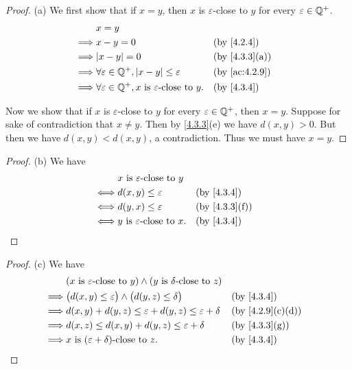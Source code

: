 \begin{proof}{(a)}
  We first show that if \(x = y\), then \(x\) is \(\varepsilon\)-close to \(y\) for every \(\varepsilon \in \mathbb{Q}^+\).
  \begin{align*}
             & x = y                                                                                                    \\
    \implies & x - y = 0                                                               &  & \by{4.2.4}                  \\
    \implies & \abs{x - y} = 0                                                         &  & \text{(by \cref{4.3.3}(a))} \\
    \implies & \forall \varepsilon \in \Q^+, \abs{x - y} \leq \varepsilon              &  & \by{ac:4.2.9}               \\
    \implies & \forall \varepsilon \in \Q^+, x \text{ is \(\varepsilon\)-close to } y. &  & \by{4.3.4}
  \end{align*}

  Now we show that if \(x\) is \(\varepsilon\)-close to \(y\) for every \(\varepsilon \in \mathbb{Q}^+\), then \(x = y\).
  Suppose for sake of contradiction that \(x \neq y\).
  Then by \cref{4.3.3}(e) we have \(d(x, y) > 0\).
  But then we have \(d(x, y) < d(x, y)\), a contradiction.
  Thus we must have \(x = y\).
\end{proof}

\begin{proof}{(b)}
  We have
  \begin{align*}
         & x \text{ is \(\varepsilon\)-close to } y                                   \\
    \iff & d(x, y) \leq \varepsilon                  &  & \by{4.3.4}                  \\
    \iff & d(y, x) \leq \varepsilon                  &  & \text{(by \cref{4.3.3}(f))} \\
    \iff & y \text{ is \(\varepsilon\)-close to } x. &  & \by{4.3.4}
  \end{align*}
\end{proof}

\begin{proof}{(c)}
  We have
  \begin{align*}
             & (x \text{ is \(\varepsilon\)-close to } y) \land (y \text{ is \(\delta\)-close to } z)                                     \\
    \implies & \big(d(x, y) \leq \varepsilon\big) \land \big(d(y, z) \leq \delta\big)                 &  & \by{4.3.4}                     \\
    \implies & d(x, y) + d(y, z) \leq \varepsilon + d(y, z) \leq \varepsilon + \delta                 &  & \text{(by \cref{4.2.9}(c)(d))} \\
    \implies & d(x, z) \leq d(x, y) + d(y, z) \leq \varepsilon + \delta                               &  & \text{(by \cref{4.3.3}(g))}    \\
    \implies & x \text{ is \((\varepsilon + \delta)\)-close to } z.                                   &  & \by{4.3.4}
  \end{align*}
\end{proof}

